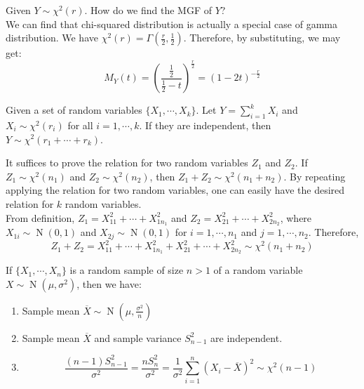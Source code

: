 \documentclass{huhtakm-template-book-v2}
\DeclareMathOperator{\N}{N}
\begin{document}
\begin{eg}
	Given $Y\sim\chi^{2}(r)$. How do we find the MGF of $Y$?\\
	We can find that chi-squared distribution is actually a special case of gamma distribution. We have $\chi^{2}(r)=\Gamma(\frac{r}{2},\frac{1}{2})$. Therefore, by substituting, we may get:
	\begin{equation*}
		M_{Y}(t)=\left(\frac{\frac{1}{2}}{\frac{1}{2}-t}\right)^{\frac{r}{2}}=(1-2t)^{-\frac{r}{2}}
	\end{equation*}
\end{eg}
\begin{thm}
	Given a set of random variables $\{X_{1},\cdots,X_{k}\}$. Let $Y=\sum_{i=1}^{k}X_{i}$ and $X_{i}\sim\chi^{2}(r_{i})$ for all $i=1,\cdots,k$. If they are independent, then $Y\sim\chi^{2}(r_{1}+\cdots+r_{k})$.
\end{thm}
\begin{proofing}
	It suffices to prove the relation for two random variables $Z_{1}$ and $Z_{2}$. If $Z_{1}\sim\chi^{2}(n_{1})$ and $Z_{2}\sim\chi^{2}(n_{2})$, then $Z_{1}+Z_{2}\sim\chi^{2}(n_{1}+n_{2})$. By repeating applying the relation for two random variables, one can easily have the desired relation for $k$ random variables.\\
	From definition, $Z_{1}=X_{11}^{2}+\cdots+X_{1n_{1}}^{2}$ and $Z_{2}=X_{21}^{2}+\cdots+X_{2n_{2}}^{2}$, where $X_{1i}\sim\N(0,1)$ and $X_{2j}\sim\N(0,1)$ for $i=1,\cdots,n_{1}$ and $j=1,\cdots,n_{2}$. Therefore,
	\begin{equation*}
		Z_{1}+Z_{2}=X_{11}^{2}+\cdots+X_{1n_{1}}^{2}+X_{21}^{2}+\cdots+X_{2n_{2}}^{2}\sim\chi^{2}(n_{1}+n_{2})
	\end{equation*}
\end{proofing}
\begin{thm}
	\label{Chapter 1 (Theorem) Normal and chi-squared distribution related to sample mean and variance}
	If $\{X_{1},\cdots,X_{n}\}$ is a random sample of size $n>1$ of a random variable $X\sim\N(\mu,\sigma^{2})$, then we have:
	\begin{enumerate}
		\item Sample mean $\overline{X}\sim\N(\mu,\frac{\sigma^{2}}{n})$
		\item Sample mean $\overline{X}$ and sample variance $S_{n-1}^{2}$ are independent.
		\item 
		\begin{equation*}
			\frac{(n-1)S_{n-1}^{2}}{\sigma^{2}}=\frac{nS_{n}^{2}}{\sigma^{2}}=\frac{1}{\sigma^{2}}\sum_{i=1}^{n}(X_{i}-\overline{X})^{2}\sim\chi^{2}(n-1)
		\end{equation*}
	\end{enumerate}
\end{thm}
\end{document}
